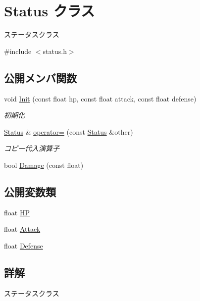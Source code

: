\hypertarget{class_status}{}\section{Status クラス}
\label{class_status}


ステータスクラス  




{\ttfamily \#include $<$status.\+h$>$}

\subsection*{公開メンバ関数}
\begin{DoxyCompactItemize}
\item 
void \mbox{\hyperlink{class_status_a04cf2752224db252d7694c2caf5caf83}{Init}} (const float hp, const float attack, const float defense)
\begin{DoxyCompactList}\small\item\em 初期化 \end{DoxyCompactList}\item 
\mbox{\hyperlink{class_status}{Status}} \& \mbox{\hyperlink{class_status_abc76064ed2504493c3bbc0f287a49525}{operator=}} (const \mbox{\hyperlink{class_status}{Status}} \&other)
\begin{DoxyCompactList}\small\item\em コピー代入演算子 \end{DoxyCompactList}\item 
bool \mbox{\hyperlink{class_status_a4ae0f2c35261aea40e2cf7649cc4f266}{Damage}} (const float)
\end{DoxyCompactItemize}
\subsection*{公開変数類}
\begin{DoxyCompactItemize}
\item 
float \mbox{\hyperlink{class_status_a0ec54fdb31c6c4b1a23b22742e6babb4}{HP}}
\item 
float \mbox{\hyperlink{class_status_aede601b020ef15845b86d631a46f8980}{Attack}}
\item 
float \mbox{\hyperlink{class_status_aee944c63904ca1b6b3b04e24b2a9ac12}{Defense}}
\end{DoxyCompactItemize}


\subsection{詳解}
ステータスクラス 

